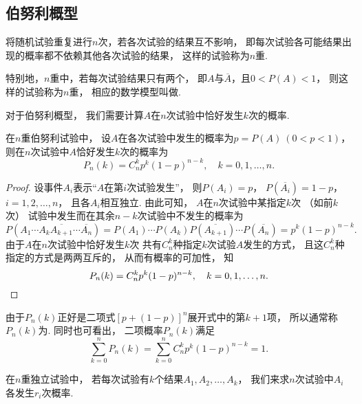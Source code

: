 \subsection{伯努利概型}
\begin{definition}
将随机试验重复进行\(n\)次，若各次试验的结果互不影响，
即每次试验各可能结果出现的概率都不依赖其他各次试验的结果，
这样的试验称为\(n\)重.

特别地，\(n\)重中，若每次试验结果只有两个，
即\(A\)与\(\overline{A}\)，且\(0 < P(A) < 1\)，
则这样的试验称为\(n\)重，
相应的数学模型叫做.
\end{definition}

对于伯努利概型，
我们需要计算\(A\)在\(n\)次试验中恰好发生\(k\)次的概率.

\begin{theorem}[二项概率]
在\(n\)重伯努利试验中，
设\(A\)在各次试验中发生的概率为\(p = P(A)\ (0 < p < 1)\)，
则在\(n\)次试验中\(A\)恰好发生\(k\)次的概率为\begin{equation}
	P_n(k) = C_n^k p^k (1-p)^{n-k}, \quad k=0,1,\dotsc,n.
\end{equation}
\begin{proof}
设事件\(A_i\)表示“\(A\)在第\(i\)次试验发生”，
则\(P(A_i)=p\)，
\(P(\overline{A_i})=1-p\)，
\(i=1,2,\dotsc,n\)，
且各\(A_i\)相互独立.
由此可知，
\(A\)在\(n\)次试验中某指定\(k\)次
（如前\(k\)次）
试验中发生而在其余\(n-k\)次试验中不发生的概率为\begin{equation*}
	P(A_1 \dotsm A_k \overline{A_{k+1}} \dotsm \overline{A_n})
	= P(A_1) \dotsm P(A_k) P(\overline{A_{k+1}}) \dotsm P(\overline{A_n})
	= p^k (1-p)^{n-k}.
\end{equation*}
由于\(A\)在\(n\)次试验中恰好发生\(k\)次
共有\(C_n^k\)种指定\(k\)次试验\(A\)发生的方式，
且这\(C_n^k\)种指定的方式是两两互斥的，
从而有概率的可加性，
知\begin{equation*}
	P_n(k) = C_n^k p^k (1-p)^{n-k},
	\quad k=0,1,\dotsc,n.
	\qedhere
\end{equation*}
\end{proof}
\end{theorem}
由于\(P_n(k)\)正好是二项式\([p+(1-p)]^n\)展开式中的第\(k+1\)项，
所以通常称\(P_n(k)\)为.
同时也可看出，
二项概率\(P_n(k)\)满足\begin{equation}
	\sum_{k=0}^n P_n(k)
	= \sum_{k=0}^n C_n^k p^k (1-p)^{n-k} = 1.
\end{equation}

在\(n\)重独立试验中，
若每次试验有\(k\)个结果\(A_1,A_2,\dotsc,A_k\)，
我们来求\(n\)次试验中\(A_i\)各发生\(r_i\)次概率.

